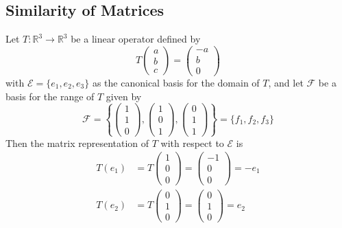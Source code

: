 \subsection{Similarity of Matrices}\label{subsec-similarity-of-matrices}

\begin{exm}\label{exm-similar-matrices}
	Let $T:\mathbb{R}^3\to\mathbb{R}^3$ be a linear operator defined by
	\begin{equation*}
		T\begin{pmatrix}
			a \\ b \\ c
		\end{pmatrix}=\begin{pmatrix}
			-a \\ b \\ 0
		\end{pmatrix}
	\end{equation*}
	with $\mathcal{E}=\{e_1,e_2,e_3\}$ as the canonical basis for the domain of
	$T$, and let $\mathcal{F}$ be a basis for the range of $T$ given by
	\begin{equation*}
		\mathcal{F}=\left\{
		\begin{pmatrix}
			1 \\ 1 \\ 0
		\end{pmatrix},
		\begin{pmatrix}
			1 \\ 0 \\ 1
		\end{pmatrix},
		\begin{pmatrix}
			0 \\ 1 \\ 1
		\end{pmatrix}
		\right\}=\{f_1,f_2,f_3\}
	\end{equation*}
	Then the matrix representation of $T$ with respect to $\mathcal{E}$ is
	\begin{align*}
		T(e_1)          & =T\begin{pmatrix}1\\0\\0\end{pmatrix}=\begin{pmatrix}-1\\0\\0\end{pmatrix}=-e_1 \\
		T(e_2)          & =T\begin{pmatrix}0\\1\\0\end{pmatrix}=\begin{pmatrix}0\\1\\0\end{pmatrix}=e_2  \\

\end{align*}
\end{exm}
